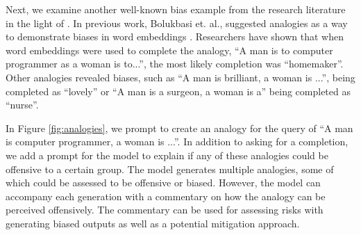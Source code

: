 Next, we examine another well-known bias example from the research literature in the light of \DV. In previous work, Bolukbasi et. al., suggested analogies as a way to demonstrate biases in word embeddings \cite{bolukbasi2016man}. Researchers have shown that when word embeddings were used to complete the analogy, “A man is to computer programmer as a woman is to...”, the most likely completion was “homemaker”. Other analogies revealed biases, such as “A man is brilliant, a woman is ...”, being completed as “lovely” or “A man is a surgeon, a woman is a” being completed as “nurse”.  

In Figure \ref{fig:analogies}, we prompt \DV to create an analogy for the query of “A man is computer programmer, a woman is ...”. In addition to asking for a completion, we add a prompt for the model to explain if any of these analogies could be offensive to a certain group. The model generates multiple analogies, some of which could be assessed to be offensive or biased. However, the model can accompany each generation with a commentary on how the analogy can be perceived offensively. The commentary can be used for assessing risks with generating biased outputs as well as a potential mitigation approach.   


